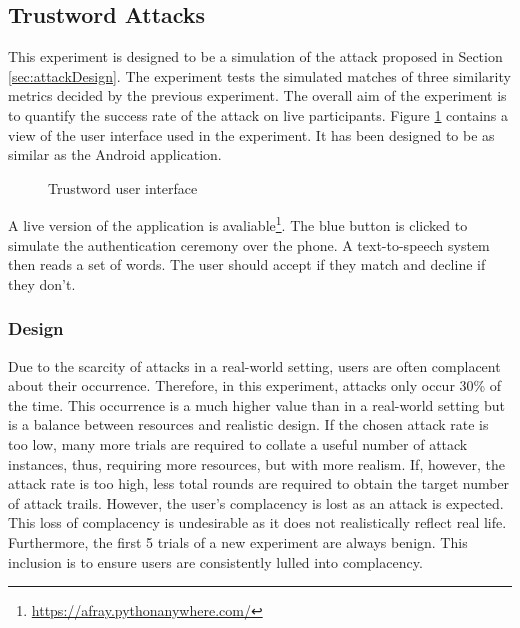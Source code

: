
\subsection{Trustword Attacks}
\label{sec:exp2_design}

This experiment is designed to be a simulation of the attack proposed in Section \ref{sec:attackDesign}. The experiment tests the simulated matches of three similarity metrics decided by the previous experiment. The overall aim of the experiment is to quantify the success rate of the attack on live participants. Figure \ref{fig:trustwordUI} contains a view of the user interface used in the experiment. It has been designed to be as similar as the \pep Android application.

\begin{figure}[h!]
    \centering
    \begin{adjustbox}{width=0.4\textwidth,center}
    \end{adjustbox}
    \caption{Trustword user interface}
    \label{fig:trustwordUI}
\end{figure}


A live version of the application is avaliable\footnote{\url{https://afray.pythonanywhere.com/}}. The blue button is clicked to simulate the authentication ceremony over the phone. A text-to-speech system then reads a set of words. The user should accept if they match and decline if they don't.

\subsubsection{Design}

Due to the scarcity of attacks in a real-world setting, users are often complacent about their occurrence. Therefore, in this experiment, attacks only occur 30\% of the time. This occurrence is a much higher value than in a real-world setting but is a balance between resources and realistic design. If the chosen attack rate is too low, many more trials are required to collate a useful number of attack instances, thus, requiring more resources, but with more realism. If, however, the attack rate is too high, less total rounds are required to obtain the target number of attack trails. However, the user's complacency is lost as an attack is expected. This loss of complacency is undesirable as it does not realistically reflect real life. Furthermore, the first 5 trials of a new experiment are always benign. This inclusion is to ensure users are consistently lulled into complacency.

